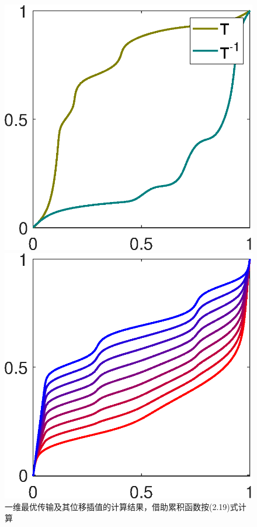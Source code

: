 \documentclass[cn,10pt,math=newtx,citestyle=gb7714-2015,bibstyle=gb7714-2015]{elegantbook}
\begin{document}
\begin{figure}[H]
\begin{minipage}{0.24\linewidth}
		\caption*{$(\mathcal{C}_\alpha^{-1},\mathcal{C}_\beta^{-1})$}
	\end{minipage}
	\begin{minipage}{0.24\linewidth}
		\centering
		\includegraphics[width=0.95\linewidth]{figure/fig2.11/transports.eps}
		\caption*{$(T,T^{-1})$}
	\end{minipage}
	\begin{minipage}{0.24\linewidth}
		\centering
		\includegraphics[width=0.95\linewidth]{figure/fig2.11/interp-cumul.eps}
		\caption*{$(1-t)\mathcal{C}_\alpha^{-1}+t\mathcal{C}_\beta^{-1}$}
	\end{minipage}
	
	\vspace{1em}
	\caption{一维最优传输及其位移插值的计算结果，借助累积函数按(2.19)式计算}
	\label{图2.11}
\end{figure}
\end{document}
